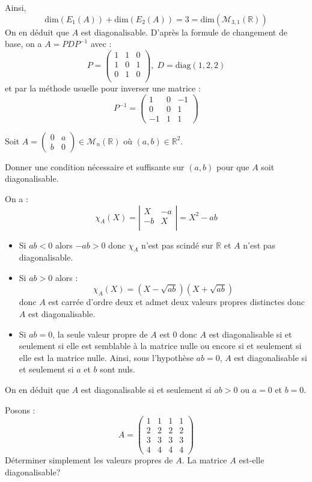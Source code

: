 \documentclass[a4paper,10pt]{report}
\begin{document}
Ainsi,
$$ \textrm{dim}(E_1(A))+ \textrm{dim}(E_2(A)) = 3 = \textrm{dim}(\mathcal{M}_{3,1}(\mathbb{R}))$$
On en déduit que $A$ est diagonalisable. D'après la formule de changement de base, on a $A = PDP^{-1}$ avec :
$$ P = \begin{pmatrix}
1 & 1 & 0\\
1 & 0 & 1 \\
0 & 1 & 0 \\
\end{pmatrix}, \; D=\textrm{diag}(1,2,2)$$
et par la méthode usuelle pour inverser une matrice :
$$ P^{-1} =  \begin{pmatrix}
1 & 0 & -1 \\
0 & 0 & 1 \\
-1 & 1 & 1 
\end{pmatrix}$$

\begin{Exercice}{} Soit $A= \begin{pmatrix}
0 & a \\
b & 0
\end{pmatrix} \in \mathcal{M}_n(\mathbb{R})$ où $(a,b) \in \mathbb{R}^2$. 

Donner une condition nécessaire et suffisante sur $(a,b)$ pour que $A$ soit diagonalisable.
\end{Exercice}

\corr On a :
$$ \chi_A(X) = \left\vert \begin{array}{cc}
X & -a \\
-b & X \\
\end{array}\right\vert = X^2-ab$$
\begin{itemize}
\item Si $ab<0$ alors $-ab>0$ donc $\chi_A$ n'est pas scindé sur $\mathbb{R}$ et $A$ n'est pas diagonalisable.
\item Si $ab>0$ alors :
$$ \chi_A(X) = (X- \sqrt{ab}) (X+ \sqrt{ab})$$
donc $A$ est carrée d'ordre deux et admet deux valeurs propres distinctes donc $A$ est diagonalisable.
\item Si $ab=0$, la seule valeur propre de $A$ est $0$ donc $A$ est diagonalisable si et seulement si elle est semblable à la matrice nulle ou encore si et seulement si elle est la matrice nulle. Ainsi, sous l'hypothèse $ab=0$, $A$ est diagonalisable si et seulement si $a$ et $b$ sont nuls.
\end{itemize}
On en déduit que $A$ est diagonalisable si et seulement si $ab>0$ ou $a=0$ et $b=0$.

\begin{Exercice}{} Posons :
    \[
    A =
    \begin{pmatrix}
      1 & 1 & 1 & 1 \\
      2 & 2 & 2 & 2 \\
      3 & 3 & 3 & 3 \\
      4 & 4 & 4 & 4
    \end{pmatrix}
    \]
Déterminer simplement les valeurs propres de $A$. La matrice $A$ est-elle diagonalisable?
\end{Exercice}
\end{document}
